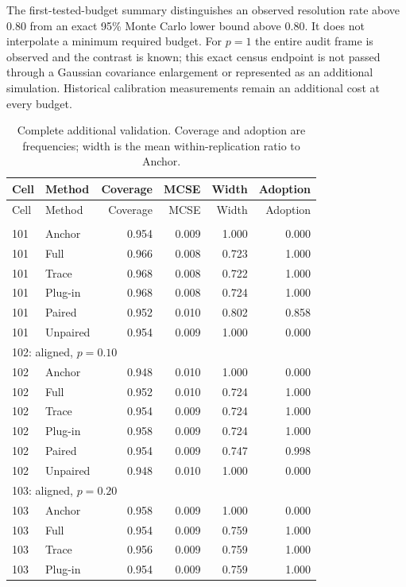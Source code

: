 The first-tested-budget summary distinguishes an observed resolution rate above 0.80 from an exact 95\% Monte Carlo lower bound above 0.80. It does not interpolate a minimum required budget. For $p=1$ the entire audit frame is observed and the contrast is known; this exact census endpoint is not passed through a Gaussian covariance enlargement or represented as an additional simulation. Historical calibration measurements remain an additional cost at every budget.
\begin{longtable}{llrrrr}
\caption{Complete additional validation. Coverage and adoption are frequencies; width is the mean within-replication ratio to Anchor.}\label{tab:s10-validation}\\
\toprule Cell & Method & Coverage & MCSE & Width & Adoption \\\midrule\endfirsthead
\toprule Cell & Method & Coverage & MCSE & Width & Adoption \\\midrule\endhead
\bottomrule\endfoot
\multicolumn{6}{l}{101: aligned, $p=0.05$}\\
101 & Anchor & 0.954 & 0.009 & 1.000 & 0.000 \\
101 & Full & 0.966 & 0.008 & 0.723 & 1.000 \\
101 & Trace & 0.968 & 0.008 & 0.722 & 1.000 \\
101 & Plug-in & 0.968 & 0.008 & 0.724 & 1.000 \\
101 & Paired & 0.952 & 0.010 & 0.802 & 0.858 \\
101 & Unpaired & 0.954 & 0.009 & 1.000 & 0.000 \\
\multicolumn{6}{l}{102: aligned, $p=0.10$}\\
102 & Anchor & 0.948 & 0.010 & 1.000 & 0.000 \\
102 & Full & 0.952 & 0.010 & 0.724 & 1.000 \\
102 & Trace & 0.954 & 0.009 & 0.724 & 1.000 \\
102 & Plug-in & 0.958 & 0.009 & 0.724 & 1.000 \\
102 & Paired & 0.954 & 0.009 & 0.747 & 0.998 \\
102 & Unpaired & 0.948 & 0.010 & 1.000 & 0.000 \\
\multicolumn{6}{l}{103: aligned, $p=0.20$}\\
103 & Anchor & 0.958 & 0.009 & 1.000 & 0.000 \\
103 & Full & 0.954 & 0.009 & 0.759 & 1.000 \\
103 & Trace & 0.956 & 0.009 & 0.759 & 1.000 \\
103 & Plug-in & 0.954 & 0.009 & 0.759 & 1.000 \\

\end{longtable}
